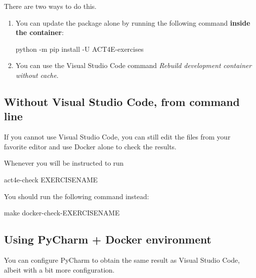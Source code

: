 There are two ways to do this.
\begin{enumerate}
    \item You can update the package alone by running the following command \textbf{inside the container}:

          \begin{console}
        python -m pip install -U ACT4E-exercises
    \end{console}
    \item You can use the Visual Studio Code command \emph{Rebuild development container without cache}.
\end{enumerate}

%
%
%
%
%
%
%
%
%

\subsection{Without Visual Studio Code, from command line}

If you cannot use Visual Studio Code, you can still edit the files from your favorite editor and use Docker alone
to check the results.

Whenever you will be instructed to run
\begin{console}
    act4e-check EXERCISENAME
\end{console}
You should run the following command instead:
\begin{console}
    make docker-check-EXERCISENAME
\end{console}

\subsection{Using PyCharm + Docker environment}
\label{sec:pycharm-plus-docker}

You can configure PyCharm to obtain the same result as Visual Studio Code, albeit with a bit more configuration.

